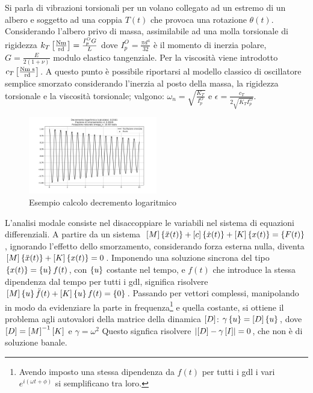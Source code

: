 Si parla di vibrazioni torsionali per un volano collegato ad un estremo di un albero e soggetto ad una coppia \(T(t)\) che provoca una rotazione \(\theta(t)\).
Considerando l'albero privo di massa, assimilabile ad una molla torsionale di rigidezza \(k_T \left[\frac{\text{Nm}}{\text{rd}}\right] = \frac{I_p^O G}{L}\) dove \(I_p^O = \frac{\pi d^4}{32}\) è il momento di inerzia polare, \(G = \frac{E}{2(1+\nu)}\) modulo elastico tangenziale.
Per la viscosità viene introdotto \(c_T \left[\frac{\text{Nm s}}{\text{rd}}\right]\).
A questo punto è possibile riportarsi al modello classico di oscillatore semplice smorzato considerando l'inerzia al posto della massa, la rigidezza torsionale e la viscosità torsionale; valgono: \(\omega_n=\sqrt{\frac{K_T}{I^O_p}}\) e \(\epsilon = \frac{c_T}{2\sqrt{K_T I^O_p}}\).

\begin{figure}[h]
    \centering
    \includegraphics[width=0.5\textwidth]{Immagini/es_decremento_log.png}
    \caption{Esempio calcolo decremento logaritmico}
\end{figure}

L'analisi modale consiste nel disaccoppiare le variabili nel sistema di equazioni differenziali.
A partire da un sistema \(\left[M\right] \left\{ \Ddot{x}(t) \right\} + \left[ c \right] \left\{ \dot{x}(t) \right\} + \left[ K \right] \left\{ x(t) \right\} = \left\{ F(t) \right\}\), ignorando l'effetto dello smorzamento, considerando forza esterna nulla, diventa \(\left[M\right] \left\{ \Ddot{x}(t) \right\} + \left[ K \right] \left\{ x(t) \right\} = 0 \). 
Imponendo una soluzione sincrona del tipo \(\left\{ x(t) \right\} = \left\{ u \right\} f(t)\), con \(\left\{ u \right\}\) costante nel tempo, e \(f(t)\) che introduce la stessa dipendenza dal tempo per tutti i gdl, significa risolvere \(\left[M\right] \left\{ u \right\} \Ddot{f}(t) + \left[ K \right] \left\{ u \right\} f(t) = \left\{ 0 \right\}\).
Passando per vettori complessi, manipolando in modo da evidenziare la parte in frequenza\footnote{Avendo imposto una stessa dipendenza da \(f(t)\) per tutti i gdl i vari \(e^{i(\omega t +\phi)}\) si semplificano tra loro.} e quella costante, si ottiene il problema agli autovalori della matrice della dinamica \(\left[ D \right]\): \(\gamma \left\{ u \right\} = \left[ D \right] \left\{ u \right\} \), dove \(\left[ D \right] = \left[M\right]^{-1} \left[ K \right]\) e \(\gamma = \omega^2\)
Questo signfica risolvere \(\left|\left[ D \right] - \gamma \left[ I \right]\right| = 0\), che non è di soluzione banale.

